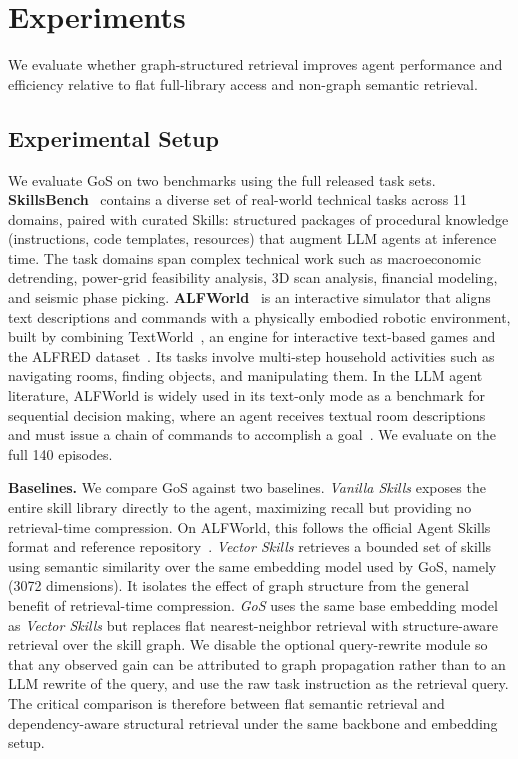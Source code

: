\section{Experiments}
We evaluate whether graph-structured retrieval improves agent performance and efficiency relative to flat full-library access and non-graph semantic retrieval.


\subsection{Experimental Setup}
We evaluate GoS on two benchmarks using the full released task sets.
%
\textbf{SkillsBench}~\citep{li2026skillsbench} contains a diverse set of real-world technical tasks across 11 domains, paired with curated Skills: structured packages of procedural knowledge (instructions, code templates, resources) that augment LLM agents at inference time.
%
The task domains span complex technical work such as macroeconomic detrending, power-grid feasibility analysis, 3D scan analysis, financial modeling, and seismic phase picking.
%
%
\textbf{ALFWorld}~\citep{shridhar2020alfworld} is an interactive simulator that aligns text descriptions and commands with a physically embodied robotic environment, built by combining TextWorld~\citep{cote2018textworld}, an engine for interactive text-based games and the ALFRED dataset~\citep{shridhar2020alfred}.
%
Its tasks involve multi-step household activities such as navigating rooms, finding objects, and manipulating them.
%
In the LLM agent literature, ALFWorld is widely used in its text-only mode as a benchmark for sequential decision making, where an agent receives textual room descriptions and must issue a chain of commands to accomplish a goal~\citep{yao2023react, reflexion2023}. We evaluate on the full 140 episodes.


\noindent\textbf{Baselines.}
%
We compare GoS against two baselines.
%
\textit{Vanilla Skills} exposes the entire skill library directly to the agent, maximizing recall but providing no retrieval-time compression. On ALFWorld, this follows the official Agent Skills format and reference repository~\citep{agentskills2026}.
%
\textit{Vector Skills} retrieves a bounded set of skills using semantic similarity over the same embedding model used by GoS, namely ~\citep{openai2024textembedding3large} (3072 dimensions). It isolates the effect of graph structure from the general benefit of retrieval-time compression.
%
\textit{GoS} uses the same base embedding model as \textit{Vector Skills} but replaces flat nearest-neighbor retrieval with structure-aware retrieval over the skill graph. We disable the optional query-rewrite module so that any observed gain can be attributed to graph propagation rather than to an LLM rewrite of the query, and use the raw task instruction as the retrieval query. The critical comparison is therefore between flat semantic retrieval and dependency-aware structural retrieval under the same backbone and embedding setup.


